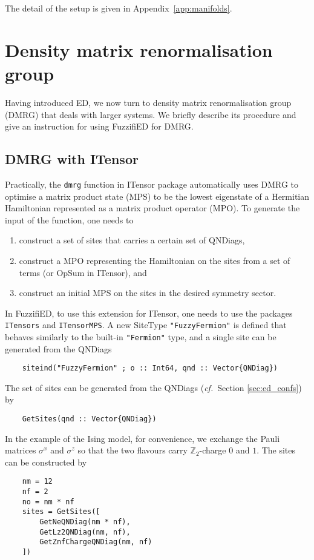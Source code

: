 \documentclass{timesjhep}
\begin{document}
The detail of the setup is given in Appendix~\ref{app:manifolds}.

\section{Density matrix renormalisation group}
\label{sec:dmrg}

Having introduced ED, we now turn to density matrix renormalisation group (DMRG) that deals with larger systems. We briefly describe its procedure and give an instruction for using FuzzifiED for DMRG.

\subsection{DMRG with ITensor}

Practically, the \lstinline|dmrg| function in ITensor package automatically uses DMRG to optimise a matrix product state (MPS) to be the lowest eigenstate of a Hermitian Hamiltonian represented as a matrix product operator (MPO). To generate the input of the function, one needs to
\begin{enumerate}
    \item construct a set of sites that carries a certain set of QNDiags,
    \item construct a MPO representing the Hamiltonian on the sites from a set of terms (or OpSum in ITensor), and
    \item construct an initial MPS on the sites in the desired symmetry sector.
\end{enumerate}

In FuzzifiED, to use this extension for ITensor, one needs to use the packages \lstinline|ITensors| and \lstinline|ITensorMPS|. A new SiteType \lstinline|"FuzzyFermion"| is defined that behaves similarly to the built-in \lstinline|"Fermion"| type, and a single site can be generated from the QNDiags
\begin{lstlisting}
    siteind("FuzzyFermion" ; o :: Int64, qnd :: Vector{QNDiag})
\end{lstlisting}
The set of sites can be generated from the QNDiags (\textit{cf.}~Section \ref{sec:ed_confs}) by
\begin{lstlisting}
    GetSites(qnd :: Vector{QNDiag})
\end{lstlisting}

In the example of the Ising model, for convenience, we exchange the Pauli matrices $\sigma^x$ and $\sigma^z$ so that the two flavours carry $\mathbb{Z}_2$-charge $0$ and $1$. The sites can be constructed by
\begin{lstlisting}
    nm = 12
    nf = 2
    no = nm * nf
    sites = GetSites([
        GetNeQNDiag(nm * nf),
        GetLz2QNDiag(nm, nf),
        GetZnfChargeQNDiag(nm, nf)
    ])
\end{lstlisting}
\end{document}
